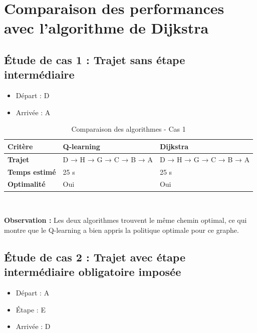 \documentclass{article}
\begin{document}
\section{Comparaison des performances avec l'algorithme de Dijkstra}
\subsection{Étude de cas 1 : Trajet sans étape intermédiaire}
\begin{itemize}
    \item Départ : D
    \item Arrivée : A
\end{itemize}

\begin{table}[H]
    \centering
    \begin{tabular}{|l|l|l|}
        \hline
        \textbf{Critère} & \textbf{Q-learning} & \textbf{Dijkstra} \\
        \hline
        \textbf{Trajet} & D → H → G → C → B → A & D → H → G → C → B → A \\
       \hline
        \textbf{Temps estimé} & 25 s & 25 s \\
       \hline
        \textbf{Optimalité} & Oui & Oui \\
        \hline
    \end{tabular}  \\ 
    \caption{Comparaison des algorithmes - Cas 1}
\vspace{0.25cm} 
\hspace{1cm} 
\textbf{Observation :} Les deux algorithmes trouvent le même chemin optimal, ce qui montre que le Q-learning a bien appris la politique optimale pour ce graphe.

\end{table}

\subsection{Étude de cas 2 : Trajet avec étape intermédiaire obligatoire imposée}
\begin{itemize}
    \item Départ : A
    \item Étape : E
    \item Arrivée : D
\end{itemize}
\end{document}
